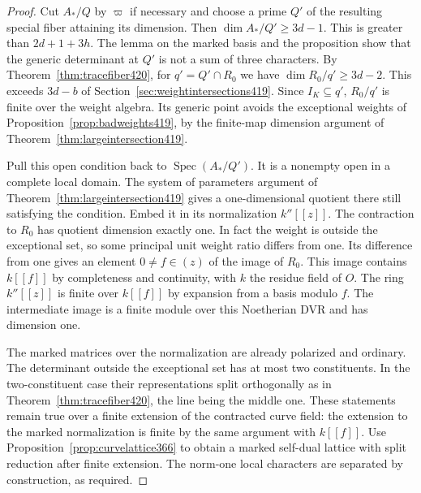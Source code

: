\documentclass[a4paper,11pt]{article}
\theoremstyle{definition}
\theoremstyle{remark}
\numberwithin{equation}{section}
\begin{document}
\begin{proof}
Cut \(A_*/Q\) by \(\varpi\) if necessary and choose a prime
\(Q'\) of the resulting special fiber attaining its dimension.
Then \(\dim A_*/Q'\ge3d-1\). This is greater than
\(2d+1+3h\). The lemma on the marked basis and the proposition
show that the generic determinant at \(Q'\) is not a sum of
three characters. By Theorem~\ref{thm:tracefiber420}, for
\(q'=Q'\cap R_0\) we have \(\dim R_0/q'\ge3d-2\).
This exceeds \(3d-b\) of Section~\ref{sec:weightintersections419}.
Since \(I_K\subseteq q'\), \(R_0/q'\) is finite over the weight
algebra. Its generic point avoids the exceptional weights of
Proposition~\ref{prop:badweights419}, by the finite-map dimension
argument of Theorem~\ref{thm:largeintersection419}.

Pull this open condition back to \(\operatorname{Spec}(A_*/Q')\).
It is a nonempty open in a complete local domain. The system of
parameters argument of Theorem~\ref{thm:largeintersection419}
gives a one-dimensional quotient there still satisfying the
condition. Embed it in its normalization \(k''[[z]]\). The
contraction to \(R_0\) has quotient dimension exactly one.
In fact the weight is outside the exceptional set, so some
principal unit weight ratio differs from one. Its difference
from one gives an element \(0\ne f\in (z)\) of the image
of \(R_0\). This image contains \(k[[f]]\) by completeness
and continuity, with \(k\) the residue field of \(O\).
The ring \(k''[[z]]\) is finite over \(k[[f]]\) by expansion
from a basis modulo \(f\). The intermediate image is a finite
module over this Noetherian DVR and has dimension one.

The marked matrices over the normalization are already
polarized and ordinary. The determinant outside the exceptional
set has at most two constituents. In the two-constituent
case their representations split orthogonally as in
Theorem~\ref{thm:tracefiber420}, the line being the middle
one. These statements remain true over a finite extension
of the contracted curve field: the extension to the marked
normalization is finite by the same argument with \(k[[f]]\).
Use Proposition~\ref{prop:curvelattice366} to obtain a marked
self-dual lattice with split reduction after finite extension.
The norm-one local characters are separated by construction,
as required.
\end{proof}
\end{document}
